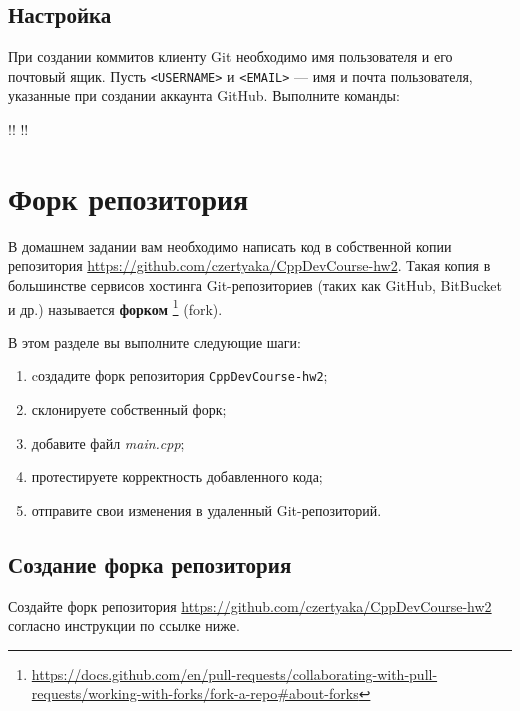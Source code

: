 \documentclass[14pt]{extarticle}
\begin{document}
    \subsection{Настройка}

        При создании коммитов клиенту Git необходимо имя пользователя и его почтовый
        ящик.
        Пусть \verb|<USERNAME>| и \verb|<EMAIL>| --- имя и почта пользователя,
        указанные при создании аккаунта GitHub.
        Выполните команды:

        \begin{terminalwindow}
!!
!!
        \end{terminalwindow}

\section{Форк репозитория}

    В домашнем задании вам необходимо написать код в собственной копии
    репозитория \url{https://github.com/czertyaka/CppDevCourse-hw2}.
    Такая копия в большинстве сервисов хостинга Git-репозиториев
    (таких как GitHub, BitBucket и др.) называется \textbf{форком}
    \footnote{\url{https://docs.github.com/en/pull-requests/collaborating-with-pull-requests/working-with-forks/fork-a-repo\#about-forks}}
    (fork).

    В этом разделе вы выполните следующие шаги:

    \begin{enumerate}
        \item cоздадите форк репозитория \texttt{CppDevCourse-hw2};
        \item склонируете собственный форк;
        \item добавите файл \textit{main.cpp};
        \item протестируете корректность добавленного кода;
        \item отправите свои изменения в удаленный Git-репозиторий.
    \end{enumerate}

    \subsection{Создание форка репозитория}

    Создайте форк репозитория \url{https://github.com/czertyaka/CppDevCourse-hw2}
    согласно инструкции по ссылке ниже.
\end{document}
